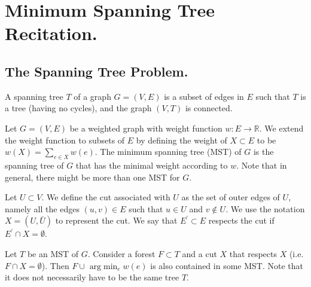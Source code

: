 


\ifdefined\BOOK
\else
\setcounter{chapter}{10}
\fi
\chapter{Minimum Spanning Tree Recitation.} 


\section{The Spanning Tree Problem.}

\begin{definition}
  A spanning tree $T$ of a graph $G=(V,E)$ is a subset of edges in $E$ such that $T$ is a tree (having no cycles), and the graph $(V,T)$ is connected.   
\end{definition}

\begin{problem}[MST] Let $G = (V,E)$ be a weighted graph with weight function $w : E \rightarrow \mathbb{R}$. We extend the weight function to subsets of $E$ by defining the weight of $X\subset E$ to be $w(X)= \sum_{e \in X}w(e)$. The minimum spanning tree (MST) of $G$ is the spanning tree of $G$ that has the minimal weight according to $w$. Note that in general, there might be more than one MST for $G$. 
\end{problem}

\begin{definition}
  \label{def:cut}
  Let $U \subset V$. We define the cut associated with $U$ as the set of outer edges of $U$, namely all the edges $(u,v)\in E$ such that $u\in U$ and $v \notin U$. We use the notation $X = (U, \bar{U})$ to represent the cut. We say that $E^{\prime} \subset E$ respects the cut if $E^{\prime} \cap X = \emptyset$.
\end{definition} 

\begin{lemma} 
  \label{lemma:cut}
  Let $T$ be an MST of $G$. Consider a forest $F \subset T$ and a cut $X$ that respects $X$ (i.e. $F \cap X = \emptyset$). Then $F \cup \text{ arg}\min_{e} w(e)$ is also contained in some MST. Note that it does not necessarily have to be the same tree $T$. 
\end{lemma}

